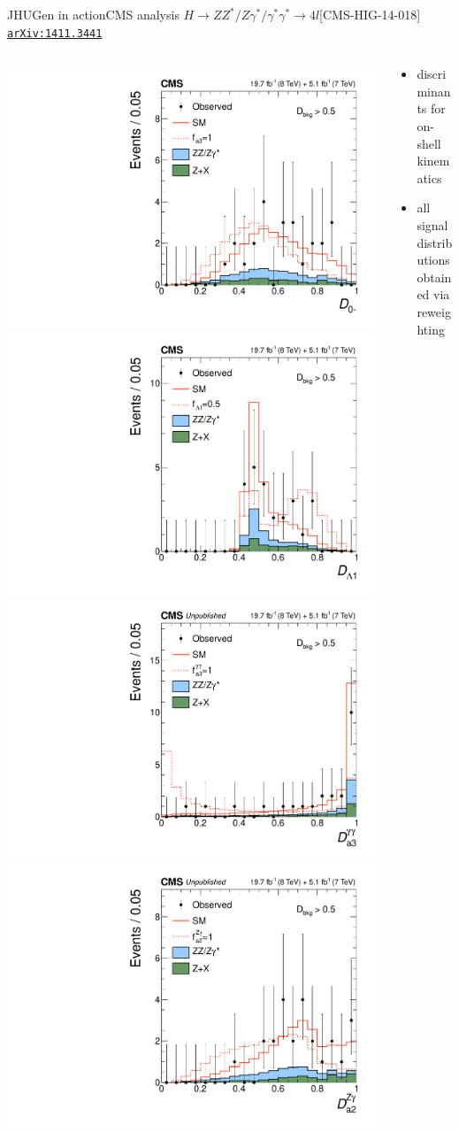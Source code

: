 \documentclass[usenames,dvipsnames,svgnames,table]{beamer}
\newcommand{\arxiv}[1]{\href{http://arxiv.org/abs/#1}{\nolinkurl{arXiv:#1}}}
\begin{document}
\begin{frame}{JHUGen in action}{CMS analysis $H \to ZZ^*/Z\gamma^*/\gamma^*\gamma^* \to 4l$\hfill [CMS-HIG-14-018] \arxiv{1411.3441}}
\begin{columns}
\begin{column}{0.6\textwidth}
\includegraphics[width=.5\columnwidth]{HVV/d0minus}
\includegraphics[width=.5\columnwidth]{HVV/dlambda1} \\
\includegraphics[width=.5\columnwidth]{HVV/Da3gammagamma}
\includegraphics[width=.5\columnwidth]{HVV/Da2Zgamma}
\end{column}
\begin{column}{0.4\textwidth}
\begin{itemize}
\item discriminants for on-shell kinematics
\item all signal distributions obtained via reweighting
\end{itemize}
\end{column}
\end{columns}
\end{frame}
\end{document}
